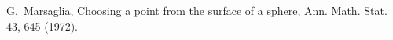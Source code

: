 G.~Marsaglia,
\newblock Choosing a point from the surface of a sphere,
\newblock Ann. Math. Stat. 43, 645 (1972).
